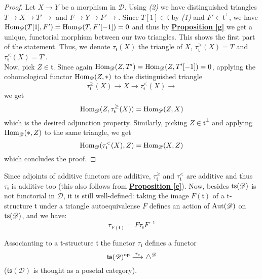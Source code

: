 \begin{proof}
Let $X \longrightarrow Y$ be a morphism in $\mathscr{D}$. Using \textit{(2)} we have distinguished triangles $T \longrightarrow X \longrightarrow T' \longrightarrow $ and  $F \longrightarrow Y \longrightarrow F' \longrightarrow $. Since $T[1] \in \mathfrak{t}$ by \textit{(1)} and $F' \in \mathfrak{t}^{\perp}$, we have $\textnormal{Hom}_{\mathscr{D}}(T[1],F')=\textnormal{Hom}_{\mathscr{D}}(T,F'[-1])=0$ and thus by \hyperref[g]{\textbf{Proposition \ref*{g}}} we get a unique, functorial morphism between our two triangles. This shows the first part of the statement. Thus, we denote $\tau_{\mathfrak{t}}(X)$ the triangle of $X$, $\tau^{\ge}_{\mathfrak{t}}(X)=T$ and $\tau^{<}_{\mathfrak{t}}(X)=T'$. \\
Now, pick $Z \in \mathfrak{t}$. Since again $\textnormal{Hom}_{\mathscr{D}}(Z,T')=\textnormal{Hom}_{\mathscr{D}}(Z,T'[-1])=0$, applying the cohomological functor $\textnormal{Hom}_{\mathscr{D}}(Z,*)$ to the distinguished triangle $$\tau^{\ge}_{\mathfrak{t}}(X) \longrightarrow X \longrightarrow \tau^{<}_{\mathfrak{t}}(X) \longrightarrow $$ we get $$\textnormal{Hom}_{\mathscr{D}}(Z,\tau^{\ge}_{\mathfrak{t}}(X))=\textnormal{Hom}_{\mathscr{D}}(Z,X)$$ which is the desired adjunction property. Similarly, picking $Z \in \mathfrak{t}^{\perp}$ and applying $\textnormal{Hom}_{\mathscr{D}}(*,Z)$ to the same triangle, we get  $$\textnormal{Hom}_{\mathscr{D}}(\tau^{<}_{\mathfrak{t}}(X),Z)=\textnormal{Hom}_{\mathscr{D}}(X,Z)$$ which concludes the proof. 
\end{proof}

Since adjoints of additive functors are additive, $\tau^{\ge}_{\mathfrak{t}}$ and $\tau^{<}_{\mathfrak{t}}$ are additive and thus $\tau_{\mathfrak{t}}$ is additive too (this also follows from \hyperref[e]{\textbf{Proposition \ref*{e}}}).
Now, besides $\textnormal{ts}(\mathscr{D})$ is not functorial in $\mathscr{D}$, it is still well-defined: taking the image $F(\mathfrak{t})$ of a t-structure $\mathfrak{t}$ under a triangle autoequivalense $F$ defines an action of $\textnormal{Aut}(\mathscr{D})$ on $\textnormal{ts}(\mathscr{D})$, and we have: $$\tau_{F( \mathfrak{t})} = F \tau_{\mathfrak{t}} F^{-1}$$

\begin{prop}\label{h}
Associanting to a t-structure $\mathfrak{t}$ the functor $\tau_{\mathfrak{t}}$ defines a functor $$\mathfrak{ts}(\mathscr{D})^{\textnormal{op}} \overset{\tau_*}{\longrightarrow} \bigtriangleup^{\mathscr{D}}$$
($\mathfrak{ts}(\mathscr{D})$ is thought as a posetal category).
\end{prop}

